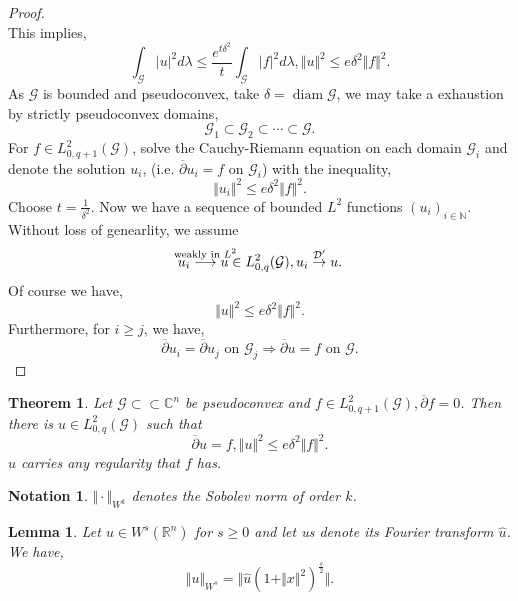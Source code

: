 \documentclass{article}
\newtheorem{theorem}{Theorem} [section]
\newtheorem{lemma}{Lemma}[section]
\newtheorem{notation}{Notation}[section]
\DeclareMathOperator{\diam}{diam}
\newcommand{\norm}[1]{\Vert #1 \Vert}
\newcommand{\N}[0]{\mathbb{N}}
\newcommand{\R}[0]{\mathbb{R}}
\newcommand{\C}[0]{\mathbb{C}}
\newcommand{\G}[0]{\mathcal{G}}
\newcommand{\cbd}[0]{\overline{\partial}}
\newcommand{\compembed}[0]{\subset\subset}
\begin{document}
\begin{proof}
\begin{equation*}
      \end{equation*}
      This implies,
      \begin{equation*}
        \int_\G\vert u\vert^2d\lambda \leq {\frac {e^{t\delta^2}} t}\int_\G \vert f\vert^2d\lambda, \norm{u}^2\leq e\delta^2\norm{f}^2.
      \end{equation*}
      As $\G$ is bounded and pseudoconvex, take $\delta=\diam\G$, we may take a exhaustion by strictly pseudoconvex domains,
      \begin{equation*}
        \G_1\subset\G_2\subset\cdots\subset\G.
      \end{equation*}
      For $f\in L^2_{0,q+1}(\G)$, solve the Cauchy-Riemann equation on each domain $\G_i$ and denote the solution $u_i$, (i.e. $\cbd u_i=f$ on $\G_i$) with the inequality,
      \begin{equation*}
        \norm{u_i}^2\leq e\delta^2\norm{f}^2.
      \end{equation*}
      Choose $t={\frac 1 {\delta^2}}$. Now we have a sequence of bounded $L^2$ functions $(u_i)_{i\in \N}$. Without loss of genearlity, we assume
      \begin{equation*}
        u_i\stackrel{\text{\makebox[0pt][c]{weakly in $L^2$}}}{\longrightarrow} u\in L_{0,q}^2(\G), u_i\stackrel{\mathcal{D}'}{\to}u.
      \end{equation*}
      Of course we have,
      \begin{equation*}
        \norm{u}^2\leq e\delta^2\norm{f}^2.
      \end{equation*}
      Furthermore, for $i\geq j$, we have,
      \begin{equation*}
        \cbd u_i=\cbd u_j\text{ on $\G_j$} \Rightarrow \cbd u = f \text{ on $\G$}.
      \end{equation*}
    \end{proof}
    \begin{theorem}
      Let $\G\compembed\C^n$ be pseudoconvex and $f\in L^2_{0,q+1}(\G),\cbd f=0$. Then there is $u\in L^2_{0,q}(\G)$ such that 
      \begin{equation*}
        \cbd u = f,\norm{u}^2\leq e\delta^2\norm{f}^2.
      \end{equation*}
      $u$ carries any regularity that $f$ has.
    \end{theorem}
    \begin{notation}
      $\norm{\cdot}_{W^k}$ denotes the Sobolev norm of order $k$.
    \end{notation}
    \begin{lemma}
      Let $u\in W^s(\R^n)$ for $s\geq0$ and let us denote its Fourier transform $\hat{u}$. We have,
      \begin{equation*}
        \norm{u}_{W^s}=\norm{\hat{u}(1+\norm{x}^2)^{{\frac s 2}}}.
      \end{equation*}
    \end{lemma}
\end{document}
